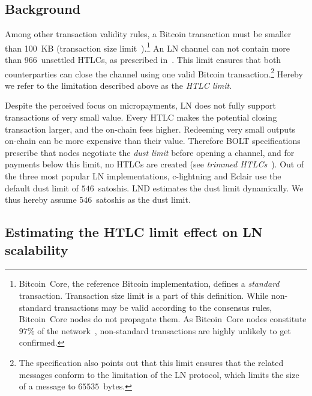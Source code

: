\subsection{Background} \label{max-htlc-background}

Among other transaction validity rules, a Bitcoin transaction must be smaller than 100~KB (transaction size limit~\cite{StandardTxBitcoinSE, BitcoinCoreMaxTxWeight}).\footnote{Bitcoin~Core, the reference Bitcoin implementation, defines a \textit{standard} transaction. Transaction size limit is a part of this definition. While non-standard transactions may be valid according to the consensus rules, Bitcoin~Core nodes do not propagate them. As Bitcoin~Core nodes constitute $97\%$ of the network~\cite{CoinDance}, non-standard transactions are highly unlikely to get confirmed.}
An LN channel can not contain more than 966~unsettled HTLCs, as prescribed in~\cite{BOLT2Rationale}.
This limit ensures that both counterparties can close the channel using one valid Bitcoin transaction.\footnote{The specification also points out that this limit ensures that the related messages conform to the limitation of the LN protocol, which limits the size of a message to $65535$~bytes.}
Hereby we refer to the limitation described above as the \textit{HTLC limit}.

Despite the perceived focus on micropayments, LN does not fully support transactions of very small value.
Every HTLC makes the potential closing transaction larger, and the on-chain fees higher.
Redeeming very small outputs on-chain can be more expensive than their value.
Therefore BOLT specifications prescribe that nodes negotiate the \textit{dust limit} before opening a channel, and for payments below this limit, no HTLCs are created (see \textit{trimmed HTLCs}~\cite{BOLT3Trimmed}).
Out of the three most popular LN implementations, c-lightning and Eclair use the default dust limit of $546$~satoshis.
LND estimates the dust limit dynamically.
We thus hereby assume $546$~satoshis as the dust limit.



\subsection{Estimating the HTLC limit effect on LN scalability}	\label{estimating-concurrent channel updates}

